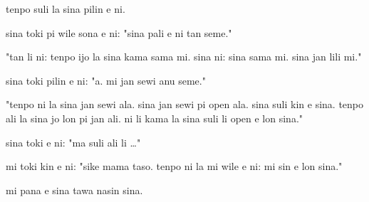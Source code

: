 \documentclass{article}
\begin{document}
tenpo suli la sina pilin e ni.

sina toki pi wile sona e ni: "sina pali e ni tan seme."

"tan li ni: tenpo ijo la sina kama sama mi. sina ni: sina sama mi. sina jan lili mi."

sina toki pilin e ni: "a. mi jan sewi anu seme."

"tenpo ni la sina jan sewi ala. sina jan sewi pi open ala. sina suli kin e sina. tenpo ali la sina jo lon pi jan ali. ni li kama la sina suli li open e lon sina."

sina toki e ni: "ma suli ali li …"

mi toki kin e ni: "sike mama taso. tenpo ni la mi wile e ni: mi sin e lon sina."

mi pana e sina tawa nasin sina.
\end{document}
